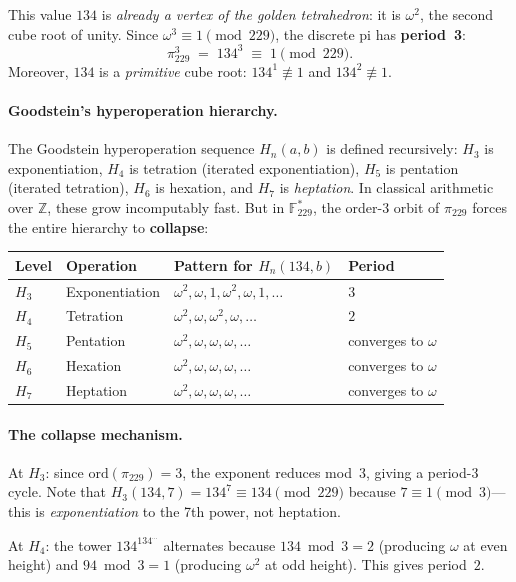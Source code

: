 This value $134$ is \emph{already a vertex of the golden tetrahedron}: it is $\omega^2$, the second cube root of unity. Since $\omega^3 \equiv 1 \pmod{229}$, the discrete pi has \textbf{period~3}:
\[
\pi_{229}^3 \;=\; 134^3 \;\equiv\; 1 \pmod{229}.
\]
Moreover, $134$ is a \emph{primitive} cube root: $134^1 \not\equiv 1$ and $134^2 \not\equiv 1$.

\paragraph{Goodstein's hyperoperation hierarchy.}
The Goodstein hyperoperation sequence $H_n(a, b)$ is defined recursively: $H_3$ is exponentiation, $H_4$ is tetration (iterated exponentiation), $H_5$ is pentation (iterated tetration), $H_6$ is hexation, and $H_7$ is \emph{heptation}. In classical arithmetic over $\mathbb{Z}$, these grow incomputably fast. But in $\mathbb{F}_{229}^*$, the order-$3$ orbit of $\pi_{229}$ forces the entire hierarchy to \textbf{collapse}:

\begin{center}
\begin{tabular}{@{}llll@{}}
\toprule
Level & Operation & Pattern for $H_n(134, b)$ & Period \\
\midrule
$H_3$ & Exponentiation & $\omega^2, \omega, 1, \omega^2, \omega, 1, \ldots$ & $3$ \\
$H_4$ & Tetration & $\omega^2, \omega, \omega^2, \omega, \ldots$ & $2$ \\
$H_5$ & Pentation & $\omega^2, \omega, \omega, \omega, \ldots$ & converges to $\omega$ \\
$H_6$ & Hexation & $\omega^2, \omega, \omega, \omega, \ldots$ & converges to $\omega$ \\
$H_7$ & Heptation & $\omega^2, \omega, \omega, \omega, \ldots$ & converges to $\omega$ \\
\bottomrule
\end{tabular}
\end{center}

\paragraph{The collapse mechanism.}
At $H_3$: since $\mathrm{ord}(\pi_{229}) = 3$, the exponent reduces mod~$3$, giving a period-$3$ cycle. Note that $H_3(134, 7) = 134^7 \equiv 134 \pmod{229}$ because $7 \equiv 1 \pmod{3}$---this is \emph{exponentiation} to the 7th power, not heptation.

At $H_4$: the tower $134^{134^{\cdots}}$ alternates because $134 \bmod 3 = 2$ (producing $\omega$ at even height) and $94 \bmod 3 = 1$ (producing $\omega^2$ at odd height). This gives period~$2$.

